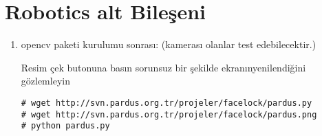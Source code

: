 \documentclass[a4paper,10pt]{article}
\begin{document}
\section{Robotics alt Bileşeni}
\begin{enumerate}
 \item opencv paketi kurulumu sonrası: (kamerası olanlar test edebilecektir.)

Resim çek butonuna basın sorunsuz bir şekilde ekranınyenilendiğini gözlemleyin
\begin{verbatim}
# wget http://svn.pardus.org.tr/projeler/facelock/pardus.py
# wget http://svn.pardus.org.tr/projeler/facelock/pardus.png
# python pardus.py
\end{verbatim}


\end{enumerate}
\end{document}
